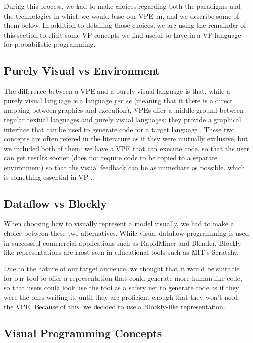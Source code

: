 \documentclass[9pt,a4paper]{extarticle}
\begin{document}
\begin{multicols}{2}
During this process, we had to make choices regarding both the paradigms and the
technologies in which we would base our VPE on, and we
describe some of them below. In addition to detailing those choices, we are
using the remainder of this section to elicit some VP concepts
we find useful to have in a VP language for probabilistic programming.

\subsection{Purely Visual vs Environment}

The difference between a VPE and a purely visual language is that, while a purely visual language is a language \textit{per se}
(meaning that it there is a direct mapping between graphics and execution), VPEs offer a middle
ground between regular textual languages and purely visual languages: they provide a graphical interface that can
be used to generate code for a target language \cite{Burnett1999}. These two
concepts are often refered in the literature as if they were mutually exclusive,
but we included both of them: we have a VPE that can execute code, so that the
user can get results sooner (does not require code to be copied to a separate
environment) so that the visual feedback can be as immediate as possible, which
is something essential in VP \cite{Shu1988}.

\subsection{Dataflow vs Blockly}

When choosing how to visually represent a model visually, we had to make a choice
between these two alternatives. While visual dataflow programming is used in
successful commercial applications such as RapidMiner and Blender, Blockly-like
representations are most seen in educational tools such as MIT's Scratchy.

Due to the nature of our target audience, we thought that it would be suitable
for our tool to offer a representation that could generate more human-like code,
so that users could look use the tool as a safety net to generate code as if they
were the ones writing it, until they are proficient enough that they won't need
the VPE. Because of this, we decided to use a Blockly-like representation.

\subsection{Visual Programming Concepts}


\end{multicols}
\end{document}

